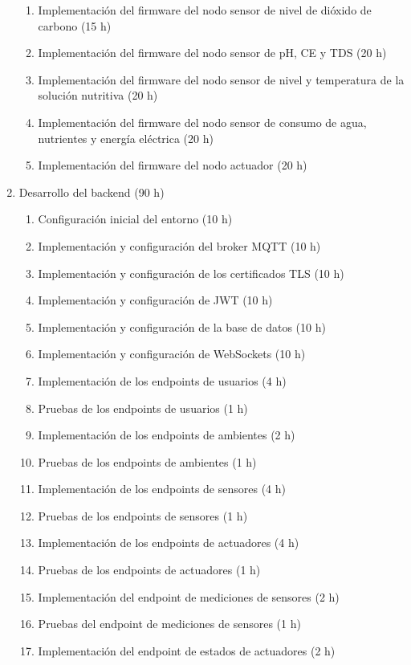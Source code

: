 \begin{enumerate}
\begin{enumerate}
		      \item Implementación del firmware del nodo sensor de nivel de dióxido de carbono (15 h)
		      \item Implementación del firmware del nodo sensor de pH, CE y TDS (20 h)
		      \item Implementación del firmware del nodo sensor de nivel y temperatura de la solución nutritiva (20 h)
		      \item Implementación del firmware del nodo sensor de consumo de agua, nutrientes y energía eléctrica (20 h)
		      \item Implementación del firmware del nodo actuador (20 h)
	      \end{enumerate}
	\item Desarrollo del backend (90 h)
	      \begin{enumerate}
		      \item Configuración inicial del entorno (10 h)
		      \item Implementación y configuración del broker MQTT (10 h)
		      \item Implementación y configuración de los certificados TLS (10 h)
		      \item Implementación y configuración de JWT (10 h)
		      \item Implementación y configuración de la base de datos (10 h)
		      \item Implementación y configuración de WebSockets (10 h)
		      \item Implementación de los endpoints de usuarios (4 h)
		      \item Pruebas de los endpoints de usuarios (1 h)
		      \item Implementación de los endpoints de ambientes (2 h)
		      \item Pruebas de los endpoints de ambientes (1 h)
		      \item Implementación de los endpoints de sensores (4 h)
		      \item Pruebas de los endpoints de sensores (1 h)
		      \item Implementación de los endpoints de actuadores (4 h)
		      \item Pruebas de los endpoints de actuadores (1 h)
		      \item Implementación del endpoint de mediciones de sensores (2 h)
		      \item Pruebas del endpoint de mediciones de sensores (1 h)
		      \item Implementación del endpoint de estados de actuadores (2 h)

\end{enumerate}
\end{enumerate}
